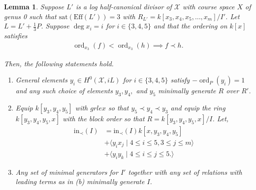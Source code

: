 \documentclass{amsart}
\theoremstyle{plain}
\newtheorem{lem}[thm]{Lemma}
\theoremstyle{definition}
\theoremstyle{remark}
\numberwithin{equation}{section}
\newcommand \sx{\mathscr X}
\DeclareMathOperator{\ord}{ord}
\newcommand \halfcan{L}
\newcommand \initial{\text{in}}
\newcommand \Eff{\text{Eff}}
\newcommand \sat{\text{sat}}
\begin{document}
\begin{lem}
\label{lem:sat-three-induction-g-0}
Suppose $L'$ is a log half-canonical divisor of $\sx$ with course
space $X$ of genus 0 such that $\sat(\Eff(\halfcan')) = 3$ with $R_
{\halfcan'} = k[x_3, x_4 , x_5, \ldots, x_m]/I'$. Let $L = L' + \frac
{1}{3}P$. Suppose $\deg x_i = i$ for $i \in \{3, 4, 5\}$ and that
the ordering on $k[x]$ satisfies
\begin{align*}
	\ord_{x_3}(f) < \ord_{x_3}(h) \implies f \prec h.
\end{align*}

\noindent
Then, the following statements hold.

\begin{enumerate}
	\item[(a)] General elements  $y_i \in H^0(\sx, iL)$ for $i \in \{3,
		4,5\}$ satisfy $-\ord_P(y_i) = 1$ and any such choice of elements $y
		_3, y_4,$ and $y_5$ minimally generate $R$ over $R'$.
	\item[(b)] Equip $k[y_3, y_4, y_5]$ with $grlex$ so that $y_5 \prec 
		y_4 \prec y_3$
		and equip the ring $k[y_3, y_4, y_5, x]$ with the block 
		order so that $R = k[y_3, y_4, y_5, x]/I$. Let,
		\begin{align*}
			\initial_\prec(I) &= \initial_\prec(I) k[x, y_3, y_4, y_5] \\
			&+ \langle y_i x_j \mid 4 \leq i \leq 5, 3 \leq j \leq m\rangle \\
			&+ \langle y_i y_k \mid 4 \leq i \leq j \leq 5.\rangle 
		\end{align*}
	\item[(c)] Any set of minimal generators for $I'$ together with 
		any set of relations with leading terms as in (b) minimally 
		generate $I$.
\end{enumerate}
\end{lem}
\end{document}
